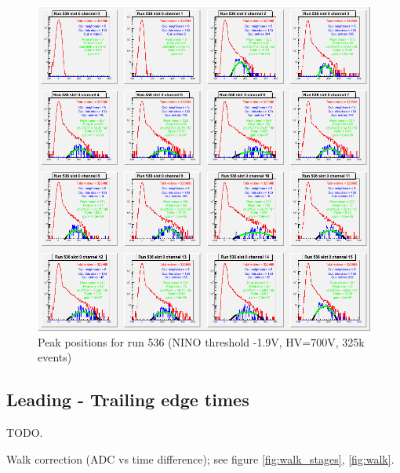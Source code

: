 \documentclass{article}
\begin{document}
\begin{figure}[htbp]
\includegraphics[width=\textwidth]{run_536_peaks_slot_0_chans_0_15_lt_5_gt_100}
\caption{Peak positions for run 536 (NINO threshold -1.9V, HV=700V, 325k events)}
\label{fig:peak_536}
\end{figure}

\subsection{Leading - Trailing edge times}\label{sec:dtime}
TODO.




Walk correction (ADC vs time difference); see figure \ref{fig:walk_stages}, \ref{fig:walk}.
\end{document}
